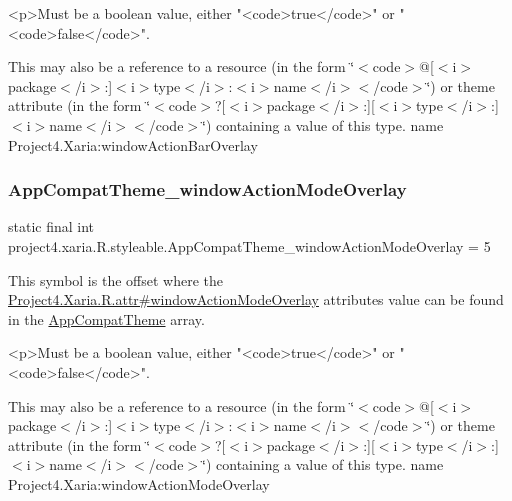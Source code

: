 \begin{DoxyVerb}      <p>Must be a boolean value, either "<code>true</code>" or "<code>false</code>".
\end{DoxyVerb}
 

This may also be a reference to a resource (in the form \char`\"{}$<$code$>$@\mbox{[}$<$i$>$package$<$/i$>$\+:\mbox{]}$<$i$>$type$<$/i$>$\+:$<$i$>$name$<$/i$>$$<$/code$>$\char`\"{}) or theme attribute (in the form \char`\"{}$<$code$>$?\mbox{[}$<$i$>$package$<$/i$>$\+:\mbox{]}\mbox{[}$<$i$>$type$<$/i$>$\+:\mbox{]}$<$i$>$name$<$/i$>$$<$/code$>$\char`\"{}) containing a value of this type.  name Project4.\+Xaria\+:window\+Action\+Bar\+Overlay \mbox{\label{classproject4_1_1xaria_1_1R_1_1styleable_a90154482a964f6451f06f63075d14158}} 
\subsubsection{\texorpdfstring{App\+Compat\+Theme\+\_\+window\+Action\+Mode\+Overlay}{AppCompatTheme\_windowActionModeOverlay}}
{\footnotesize\ttfamily static final int project4.\+xaria.\+R.\+styleable.\+App\+Compat\+Theme\+\_\+window\+Action\+Mode\+Overlay = 5\hspace{0.3cm}{\ttfamily [static]}}

This symbol is the offset where the \hyperlink{}{Project4.\+Xaria.\+R.\+attr\#window\+Action\+Mode\+Overlay} attribute\textquotesingle{}s value can be found in the \hyperlink{classproject4_1_1xaria_1_1R_1_1styleable_aad8bec413e2350f9404e6ff0e831a85d}{App\+Compat\+Theme} array.

\begin{DoxyVerb}      <p>Must be a boolean value, either "<code>true</code>" or "<code>false</code>".
\end{DoxyVerb}
 

This may also be a reference to a resource (in the form \char`\"{}$<$code$>$@\mbox{[}$<$i$>$package$<$/i$>$\+:\mbox{]}$<$i$>$type$<$/i$>$\+:$<$i$>$name$<$/i$>$$<$/code$>$\char`\"{}) or theme attribute (in the form \char`\"{}$<$code$>$?\mbox{[}$<$i$>$package$<$/i$>$\+:\mbox{]}\mbox{[}$<$i$>$type$<$/i$>$\+:\mbox{]}$<$i$>$name$<$/i$>$$<$/code$>$\char`\"{}) containing a value of this type.  name Project4.\+Xaria\+:window\+Action\+Mode\+Overlay \mbox{\label{classproject4_1_1xaria_1_1R_1_1styleable_afbfad678390f6ef619822aaa4c394909}} 
